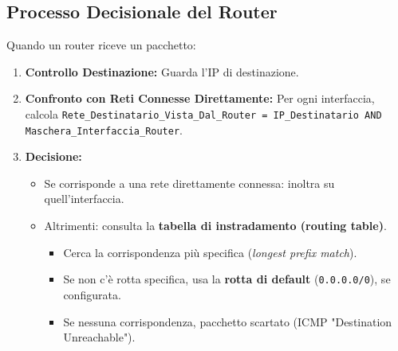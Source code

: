 \documentclass{article}
\begin{document}
\subsection{Processo Decisionale del Router}
Quando un router riceve un pacchetto:
\begin{enumerate}
    \item \textbf{Controllo Destinazione:} Guarda l'IP di destinazione.
    \item \textbf{Confronto con Reti Connesse Direttamente:} Per ogni interfaccia, calcola \texttt{Rete\_Destinatario\_Vista\_Dal\_Router = IP\_Destinatario AND Maschera\_Interfaccia\_Router}.
    \item \textbf{Decisione:}
    \begin{itemize}
        \item Se corrisponde a una rete direttamente connessa: inoltra su quell'interfaccia.
        \item Altrimenti: consulta la \textbf{tabella di instradamento (routing table)}.
        \begin{itemize}
            \item Cerca la corrispondenza più specifica (\textit{longest prefix match}).
            \item Se non c'è rotta specifica, usa la \textbf{rotta di default} (\texttt{0.0.0.0/0}), se configurata.
            \item Se nessuna corrispondenza, pacchetto scartato (ICMP "Destination Unreachable").
        \end{itemize}
    \end{itemize}
\end{enumerate}
\end{document}
